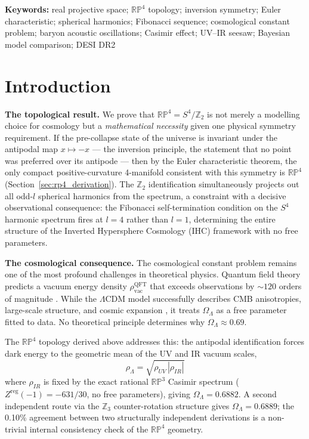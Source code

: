 \documentclass[12pt,a4paper]{article}
\begin{document}
\noindent\textbf{Keywords:} real projective space; $\mathbb{RP}^4$ topology;
inversion symmetry; Euler characteristic; spherical harmonics; Fibonacci sequence;
cosmological constant problem; baryon acoustic oscillations; Casimir effect;
UV--IR seesaw; Bayesian model comparison; DESI DR2

\section{Introduction}
\label{sec:intro}

\textbf{The topological result.}
We prove that $\mathbb{RP}^4 = S^4/\mathbb{Z}_2$ is not merely a modelling
choice for cosmology but a \emph{mathematical necessity} given one physical
symmetry requirement. If the pre-collapse state of the universe is invariant
under the antipodal map $x \mapsto -x$ --- the inversion principle, the
statement that no point was preferred over its antipode --- then by the Euler
characteristic theorem, the only compact positive-curvature 4-manifold
consistent with this symmetry is $\mathbb{RP}^4$ (Section~\ref{sec:rp4_derivation}).
The $\mathbb{Z}_2$ identification simultaneously projects out all odd-$l$
spherical harmonics from the spectrum, a constraint with a decisive
observational consequence: the Fibonacci self-termination condition on
the $S^4$ harmonic spectrum fires at $l = 4$ rather than $l = 1$,
determining the entire structure of the Inverted Hypersphere Cosmology (IHC)
framework with no free parameters.

\textbf{The cosmological consequence.}
The cosmological constant problem remains one of the most profound challenges in
theoretical physics. Quantum field theory predicts a vacuum energy density
$\rho_\mathrm{vac}^\mathrm{QFT}$ that exceeds observations by $\sim 120$ orders
of magnitude \cite{Weinberg1989,Martin2012}. While the $\Lambda$CDM model
successfully describes CMB anisotropies, large-scale structure, and cosmic expansion
\cite{Planck2020,Alam2017,Pantheon2022}, it treats $\Omega_\Lambda$ as a free
parameter fitted to data. No theoretical principle determines why
$\Omega_\Lambda \approx 0.69$.

The $\mathbb{RP}^4$ topology derived above addresses this: the antipodal
identification forces dark energy to the geometric mean of the UV and IR
vacuum scales,
\begin{equation*}
  \rho_\Lambda = \sqrt{\rho_{UV}\,|\rho_{IR}|}
\end{equation*}
where $\rho_{IR}$ is fixed by the exact rational $\mathbb{RP}^3$ Casimir
spectrum ($Z^\mathrm{reg}(-1) = -631/30$, no free parameters), giving
$\Omega_\Lambda = 0.6882$. A second independent route via the $\mathbb{Z}_3$
counter-rotation structure gives $\Omega_\Lambda = 0.6889$; the 0.10\% agreement
between two structurally independent derivations is a non-trivial internal
consistency check of the $\mathbb{RP}^4$ geometry.
\end{document}
